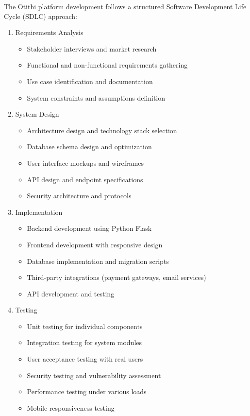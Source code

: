 \documentclass[12pt,a4paper]{report}
\begin{document}
The Otithi platform development follows a structured Software Development Life Cycle (SDLC) approach:

\begin{enumerate}
    \item Requirements Analysis
    \begin{itemize}
        \item Stakeholder interviews and market research
        \item Functional and non-functional requirements gathering
        \item Use case identification and documentation
        \item System constraints and assumptions definition
    \end{itemize}
    
    \item System Design
    \begin{itemize}
        \item Architecture design and technology stack selection
        \item Database schema design and optimization
        \item User interface mockups and wireframes
        \item API design and endpoint specifications
        \item Security architecture and protocols
    \end{itemize}
    
    \item Implementation
    \begin{itemize}
        \item Backend development using Python Flask
        \item Frontend development with responsive design
        \item Database implementation and migration scripts
        \item Third-party integrations (payment gateways, email services)
        \item API development and testing
    \end{itemize}
    
    \item Testing
    \begin{itemize}
        \item Unit testing for individual components
        \item Integration testing for system modules
        \item User acceptance testing with real users
        \item Security testing and vulnerability assessment
        \item Performance testing under various loads
        \item Mobile responsiveness testing
    \end{itemize}
    

\end{enumerate}
\end{document}
